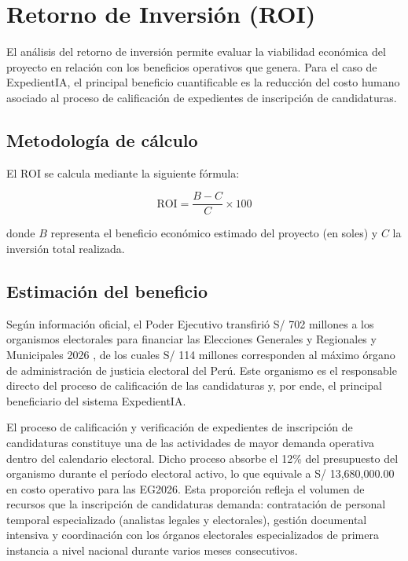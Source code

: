 \documentclass[12pt,a4paper,oneside]{book}
\begin{document}
\section{Retorno de Inversión (ROI)}
\label{sec:costos-roi}

El análisis del retorno de inversión permite evaluar la viabilidad económica del proyecto en relación con los beneficios operativos que genera. Para el caso de ExpedientIA, el principal beneficio cuantificable es la reducción del costo humano asociado al proceso de calificación de expedientes de inscripción de candidaturas.

\subsection*{Metodología de cálculo}

El ROI se calcula mediante la siguiente fórmula:

\begin{equation}
\text{ROI} = \frac{B - C}{C} \times 100
\label{eq:roi}
\end{equation}

donde $B$ representa el beneficio económico estimado del proyecto (en soles) y $C$ la inversión total realizada.

\subsection*{Estimación del beneficio}

Según información oficial, el Poder Ejecutivo transfirió S/ 702 millones a los organismos electorales para financiar las Elecciones Generales y Regionales y Municipales 2026 \cite{elcomercio2026presupuesto}, de los cuales S/ 114 millones corresponden al máximo órgano de administración de justicia electoral del Perú. Este organismo es el responsable directo del proceso de calificación de las candidaturas y, por ende, el principal beneficiario del sistema ExpedientIA.

El proceso de calificación y verificación de expedientes de inscripción de candidaturas constituye una de las actividades de mayor demanda operativa dentro del calendario electoral. Dicho proceso absorbe el 12\% del presupuesto del organismo durante el período electoral activo, lo que equivale a S/ 13{,}680{,}000.00 en costo operativo para las EG2026. Esta proporción refleja el volumen de recursos que la inscripción de candidaturas demanda: contratación de personal temporal especializado (analistas legales y electorales), gestión documental intensiva y coordinación con los órganos electorales especializados de primera instancia a nivel nacional durante varios meses consecutivos.
\end{document}
